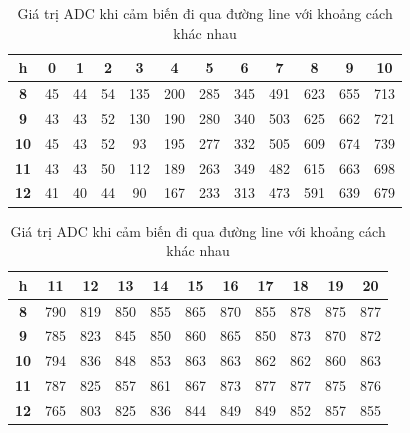             \begin{table}[H]
                \centering
                \caption{Giá trị ADC khi cảm biến đi qua đường line với khoảng cách khác nhau}
                \label{tab:4-3}
                \begin{tabular}{|c|c|c|c|c|c|c|c|c|c|c|c|}
                    \hline
                    \textbf{h} & \textbf{0} & \textbf{1} & \textbf{2} & \textbf{3} & \textbf{4} & \textbf{5} & \textbf{6} & \textbf{7} & \textbf{8} & \textbf{9} & \textbf{10} \\
                    \hline
                    \textbf{8} & 45 & 44 & 54 & 135 & 200 & 285 & 345 & 491 & 623 & 655 & 713 \\
                    \hline
                    \textbf{9} & 43 & 43 & 52 & 130 & 190 & 280 & 340 & 503 & 625 & 662 & 721 \\
                    \hline
                    \textbf{10} & 45 & 43 & 52 & 93 & 195 & 277 & 332 & 505 & 609 & 674 & 739 \\
                    \hline
                    \textbf{11} & 43 & 43 & 50 & 112 & 189 & 263 & 349 & 482 & 615 & 663 & 698 \\
                    \hline
                    \textbf{12} & 41 & 40 & 44 & 90 & 167 & 233 & 313 & 473 & 591 & 639 & 679 \\
                    \hline
                \end{tabular}
                \begin{tabular}{|c|c|c|c|c|c|c|c|c|c|c|}
                    \hline
                    \textbf{h} & \textbf{11} & \textbf{12} & \textbf{13} & \textbf{14} & \textbf{15} & \textbf{16} & \textbf{17} & \textbf{18} & \textbf{19} & \textbf{20} \\
                    \hline
                    \textbf{8} & 790 & 819 & 850 & 855 & 865 & 870 & 855 & 878 & 875 & 877 \\
                    \hline
                    \textbf{9} & 785 & 823 & 845 & 850 & 860 & 865 & 850 & 873 & 870 & 872 \\
                    \hline
                    \textbf{10} & 794 & 836 & 848 & 853 & 863 & 863 & 862 & 862 & 860 & 863 \\
                    \hline
                    \textbf{11} & 787 & 825 & 857 & 861 & 867 & 873 & 877 & 877 & 875 & 876 \\
                    \hline
                    \textbf{12} & 765 & 803 & 825 & 836 & 844 & 849 & 849 & 852 & 857 & 855 \\
                    \hline
                \end{tabular}
            \end{table}

